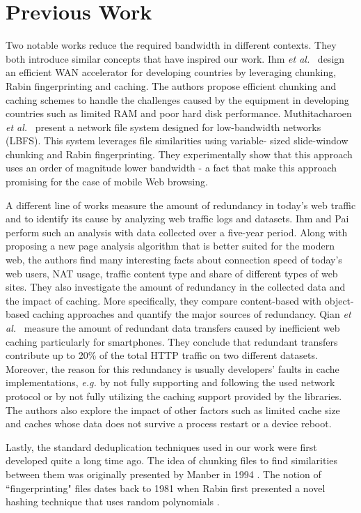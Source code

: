 \section{Previous Work}\label{sec:rel_work}
Two notable works reduce the required bandwidth in different contexts. They both introduce similar concepts that have
inspired our work. Ihm \textit{et al.}~\cite{wanax} design an efficient WAN accelerator for developing countries by leveraging chunking, Rabin fingerprinting and caching. 
The authors propose efficient chunking and caching schemes to handle the challenges caused by the equipment in developing countries such as limited RAM and poor hard disk performance. Muthitacharoen \textit{et al.}~\cite{lbfs} present a network file system designed for low-bandwidth networks (LBFS). This system leverages file similarities using variable-
sized slide-window chunking and Rabin fingerprinting. They experimentally show that this approach uses an order of
magnitude lower bandwidth - a fact that make this approach promising for the case of mobile Web browsing.

A different line of works measure the amount of redundancy in today's web traffic and to identify its cause by
analyzing web traffic logs and datasets. Ihm and Pai~\cite{modern_web_traffic} perform such an analysis %
with data collected over a five-year period. Along with proposing a new page analysis algorithm 
that is better suited for the modern web, the authors find many interesting facts about connection speed of today's web users, NAT usage, traffic content type and share of different types of web sites. They also investigate the amount of redundancy in the collected data and the impact of caching. More specifically, they compare content-based with object-based caching approaches and quantify the major sources of redundancy. Qian \textit{et al.}~\cite{web_caching} measure the amount of redundant data transfers caused by inefficient web caching particularly for smartphones. They conclude that redundant transfers contribute up to 20\% of the total HTTP traffic on two different datasets. Moreover, the reason for this redundancy is usually developers' faults in cache implementations, \textit{e.g.} by not fully supporting and following the used network protocol or by not fully utilizing the caching support provided by the libraries. The authors also explore the impact of other factors such as limited cache size and caches whose data does not survive a process restart or a device reboot.

Lastly, the standard deduplication techniques used in our work were first developed quite a long time ago. The idea of chunking files to find 
similarities between them was originally presented by Manber in 1994 \cite{manber}. The notion of ``fingerprinting" 
files dates back to 1981 when Rabin first presented a novel hashing technique that uses random polynomials \cite{rabin}.
